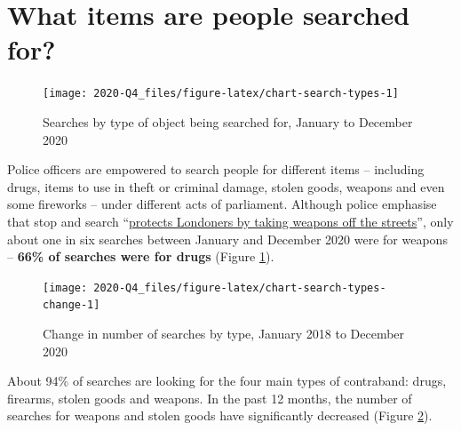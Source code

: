 \documentclass[
  a4paper,
  twoside, 11pt]{article}
\begin{document}
\hypertarget{what-items-are-people-searched-for}{%
\section{What items are people searched for?}\label{what-items-are-people-searched-for}}



\begin{figure}[tb]

{\centering \texttt{[image: 2020-Q4\_files/figure-latex/chart-search-types-1]} 

}

\caption{Searches by type of object being searched for, January to December 2020}\label{fig:chart-search-types}
\end{figure}

Police officers are empowered to search people for different items -- including drugs, items to use in theft or criminal damage, stolen goods, weapons and even some fireworks -- under different acts of parliament. Although police emphasise that stop and search ``\href{https://www.met.police.uk/police-forces/metropolitan-police/areas/about-us/about-the-met/stop-and-search/}{protects Londoners by taking weapons off the streets}'', only about one in six searches between January and December 2020 were for weapons -- \textbf{66\% of searches were for drugs} (Figure \ref{fig:chart-search-types}).



\begin{figure}[bh]

{\centering \texttt{[image: 2020-Q4\_files/figure-latex/chart-search-types-change-1]} 

}

\caption{Change in number of searches by type, January 2018 to December 2020}\label{fig:chart-search-types-change}
\end{figure}

About 94\% of searches are looking for the four main types of contraband: drugs, firearms, stolen goods and weapons. In the past 12 months, the number of searches for weapons and stolen goods have significantly decreased (Figure \ref{fig:chart-search-types-change}).
\end{document}
